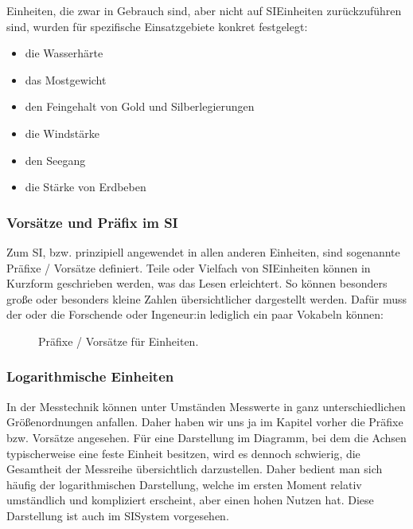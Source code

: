 \documentclass[letterpaper,10pt,english]{jupyterBook}
\let\sphinxpxdimen\pdfpxdimen\else\newdimen\sphinxpxdimen
\begin{document}
\sphinxAtStartPar
Einheiten, die zwar in Gebrauch sind, aber nicht auf SI\sphinxhyphen{}Einheiten zurückzuführen sind, wurden für spezifische Einsatzgebiete konkret festgelegt:
\begin{itemize}
\item {} 
\sphinxAtStartPar
die Wasserhärte

\item {} 
\sphinxAtStartPar
das Mostgewicht

\item {} 
\sphinxAtStartPar
den Feingehalt von Gold\sphinxhyphen{} und Silberlegierungen

\item {} 
\sphinxAtStartPar
die Windstärke

\item {} 
\sphinxAtStartPar
den Seegang

\item {} 
\sphinxAtStartPar
die Stärke von Erdbeben

\end{itemize}


\subsubsection{Vorsätze und Präfix im SI}
\label{\detokenize{content/1_Messen_Einheit:vorsatze-und-prafix-im-si}}
\sphinxAtStartPar
Zum SI, bzw. prinzipiell angewendet in allen anderen Einheiten, sind sogenannte Präfixe / Vorsätze definiert. Teile oder Vielfach von SI\sphinxhyphen{}Einheiten können in Kurzform geschrieben werden, was das Lesen erleichtert. So können besonders große oder besonders kleine Zahlen übersichtlicher dargestellt werden. Dafür muss der oder die Forschende oder Ingeneur:in lediglich ein paar Vokabeln können:

\begin{figure}[htbp]
\centering
\capstart

\noindent\sphinxincludegraphics[width=600\sphinxpxdimen]{{praefix}.png}
\caption{Präfixe / Vorsätze für Einheiten.}\label{\detokenize{content/1_Messen_Einheit:praefix}}\end{figure}


\subsubsection{Logarithmische Einheiten}
\label{\detokenize{content/1_Messen_Einheit:logarithmische-einheiten}}
\sphinxAtStartPar
In der Messtechnik können unter Umständen Messwerte in ganz unterschiedlichen Größenordnungen anfallen. Daher haben wir uns ja im Kapitel vorher die Präfixe bzw. Vorsätze angesehen. Für eine Darstellung im Diagramm, bei dem die Achsen typischerweise eine feste Einheit besitzen, wird es dennoch schwierig, die Gesamtheit der Messreihe übersichtlich darzustellen. Daher bedient man sich häufig der logarithmischen Darstellung, welche im ersten Moment relativ umständlich und kompliziert erscheint, aber einen hohen Nutzen hat. Diese Darstellung ist auch im SI\sphinxhyphen{}System vorgesehen.
\end{document}
